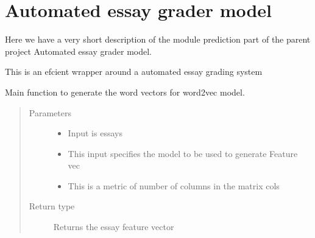 \documentclass[letterpaper,10pt,english]{sphinxmanual}
\begin{document}
\section{Automated essay grader model}
\label{\detokenize{prediction:automated-essay-grader-model}}\label{\detokenize{prediction::doc}}
Here we have a very short description of the module prediction part of the parent project Automated essay grader model.

This is an efcient wrapper around a automated essay grading system

\label{\detokenize{prediction:module-prediction}}

\begin{fulllineitems}
\label{\detokenize{prediction:prediction.getAvgFeatureVecs}}
Main function to generate the word vectors for word2vec model.
\begin{quote}\begin{description}
\item[{Parameters}] \leavevmode\begin{itemize}
\item {} 
 \textendash{} Input is essays

\item {} 
 \textendash{} This input specifies the model to be used to generate Feature vec

\item {} 
 \textendash{} This is a metric of number of columns in the matrix cols

\end{itemize}

\item[{Return type}] \leavevmode
Returns the essay feature vector

\end{description}\end{quote}

\end{fulllineitems}

\end{document}
